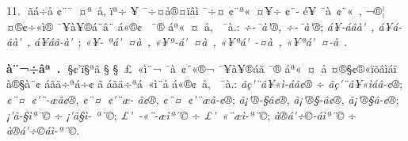 \documentclass[12pt,twoside,a4paper]{article}
\newenvironment{prym}
               {\list{}{\leftmargin1.7\parindent
                        \listparindent\parindent
                        \itemindent\parindent
                        \parsep0.5ex\topsep1ex   
               }%
                        \footnotesize
                        \item\relax}
               {\endlist}
\begin{document}
11. ^^82 ^^e3^^e1^^f7^^e5 ^^a2^^a8^^af^^a0^^a4^^aa^^a0^^e5, ^^ef^^aa^^f7 ^^ad^^a5 ^^af^^f7^^a4^^e5^^ae^^a4^^ef^^e2^^ec ^^af^^f7^^a4 ^^a2^^a8^^aa^^ab^^a0^^a4^^a5^^ad^^f7 ^^a2^^a8-\linebreak
^^e9^^a5 ^^af^^e0^^a0^^a2^^a8^^ab^^a0, ^^ac^^ae^^a6^^ad^^a0 ^^a4^^ae^^a2^^f7^^ab^^ec^^ad^^ae ^^af^^a5^^e0^^a5^^ad^^ae^^e1^^a8^^e2^^a8 ^^e1^^ab^^ae^^a2^^a0 ^^af^^ae ^^e1^^aa^^ab^^a0^^a4^^a0^^e5, \linebreak
^^ad^^a0^^af^^e0.: 
\emph{^^84^^ad^^f7-^^af^^e0\'^^ae, ^^84^^ad^^f7-^^af^^e0\'^^ae};
\emph{^^e1^^a5-^^e1^^e2^^e0\'^^a0, ^^e1^^a5^^e1-^^e2^^e0\'^^a0, ^^e1^^a5^^e1^^e2-^^e0\'^^a0}; \emph{^^8e^^ab^^a5-\linebreak
^^aa^^e1\'^^a0^^ad^^a4^^e0^^a0, ^^8e^^ab^^a5^^aa-^^e1\'^^a0^^ad^^a4^^e0^^a0, ^^8e^^ab^^a5^^aa^^e1\'^^a0^^ad-^^a4^^e0^^a0, ^^8e^^ab^^a5^^aa^^e1\'^^a0^^ad^^a4-^^e0^^a0}.
\begin{prym}
\textbf{^^8f^^e0^^a8^^ac^^f7^^e2^^aa^^a0.} 
^^93 ^^a7^^a2'^^ef^^a7^^aa^^e3 ^^a7 ^^a7^^a0^^a3^^a0^^ab^^ec^^ad^^a8^^ac ^^af^^e0^^a0^^a2^^a8^^ab^^ae^^ac ^^af^^a5^^e0^^a5^^ad^^ae^^e1^^e3 \linebreak
^^af^^ae ^^e1^^aa^^ab^^a0^^a4^^a0^^e5 ^^a4^^ae^^a7^^a2^^ae^^ab^^ef^^f5^^e2^^ec^^e1^^ef ^^e0^^ae^^a7^^e0^^a8^^a2 ^^e1^^e3^^e4^^f7^^aa^^e1^^f7^^a2 ^^e3 ^^e1^^e3^^e4^^f7^^aa^^e1^^a0^^ab^^ec^^ad^^a8^^e5 ^^e1^^ab^^ae^^a2^^a0^^e5, \linebreak
^^ad^^a0^^af^^e0.: \emph{^^e3^^e7\'^^a8^^e2^^a5^^ab^^ec-^^e1^^e2^^a2^^ae} ^^f7 \emph{^^e3^^e7\'^^a8^^e2^^a5^^ab^^ec^^e1^^e2-^^a2^^ae};
                 \emph{^^a2^^a8^^a4^^a0^^a2^^ad\'^^a8-^^e6^^e2^^a2^^ae}, \emph{^^a2^^a8^^a4^^a0^^a2^^ad\'^^a8^^e6-\linebreak
^^e2^^a2^^ae}, \emph{^^a2^^a8^^a4^^a0^^a2^^ad\'^^a8^^e6^^e2-^^a2^^ae};
\emph{^^e3^^a1\'^^ae-^^a7^^e2^^a2^^ae}, \emph{^^e3^^a1\'^^ae^^a7-^^e2^^a2^^ae}, \emph{^^e3^^a1\'^^ae^^a7^^e2-^^a2^^ae};
                          \emph{^^a1\'^^e3-^^a7^^ec^^aa^^a8^^a9} ^^f7 \emph{^^a1\'^^e3^^a7^^ec-\linebreak
^^aa^^a8^^a9}; \emph{^^a3\'^^a0-^^ab^^a8-^^e6^^ec^^aa^^a8^^a9} ^^f7 \emph{^^a3\'^^a0^^ab^^a8^^e6^^ec-^^aa^^a8^^a9};
\emph{^^e0^^ae^^e1\'^^f7^^a9-^^e1^^ec^^aa^^a8^^a9} ^^f7 \emph{^^e0^^ae^^e1\'^^f7^^a9^^e1^^ec-^^aa^^a8^^a9}.
\end{prym}
\end{document}
